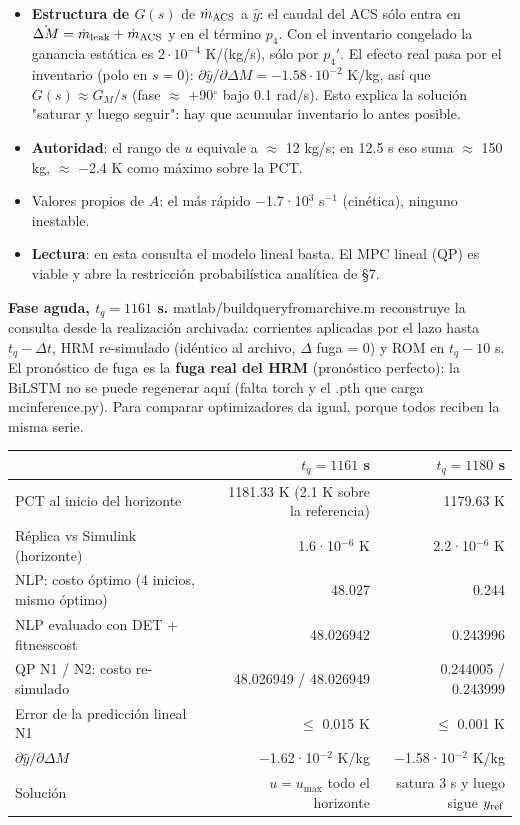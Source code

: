 \documentclass[11pt,a4paper]{article}
\newcommand{\codeus}{\textunderscore\allowbreak}
\newcommand{\code}[1]{{\small\ttfamily\let\_\codeus #1}}
\begin{document}
\begin{itemize}
\item \textbf{Estructura de $G(s)$} de $\dot m_{\rm ACS}$ a $\hat y$: el caudal del ACS sólo entra en $\dot{\Delta M}=\dot m_{\rm leak}+\dot m_{\rm ACS}$ y en el término $p_4$. Con el inventario congelado la ganancia estática es $2\cdot10^{-4}$ K/(kg/s), sólo por $p_4'$. El efecto real pasa por el inventario (polo en $s=0$): $\partial\hat y/\partial\Delta M=-1.58\cdot10^{-2}$ K/kg, así que $G(s)\approx G_M/s$ (fase $\approx$ +90$^\circ$ bajo 0.1 rad/s). Esto explica la solución "saturar y luego seguir": hay que acumular inventario lo antes posible.
\item \textbf{Autoridad}: el rango de $u$ equivale a $\approx$ 12 kg/s; en 12.5 s eso suma $\approx$ 150 kg, $\approx$ $-$2.4 K como máximo sobre la PCT.
\item Valores propios de $A$: el más rápido $-$1.7·10$^{3}$ s$^{-1}$ (cinética), ninguno inestable.
\item \textbf{Lectura}: en esta consulta el modelo lineal basta. El MPC lineal (QP) es viable y abre la restricción probabilística analítica de \S{}7.
\end{itemize}

\textbf{Fase aguda, $t_q=1161$ s.} \code{matlab/build\_query\_from\_archive.m} reconstruye la consulta desde la realización archivada: corrientes aplicadas por el lazo hasta $t_q-\Delta t$, HRM re-simulado (idéntico al archivo, $\Delta$ fuga = 0) y ROM en $t_q-10$ s. El pronóstico de fuga es la \textbf{fuga real del HRM} (pronóstico perfecto): la BiLSTM no se puede regenerar aquí (falta \code{torch} y el \code{.pth} que carga \code{mc\_inference.py}). Para comparar optimizadores da igual, porque todos reciben la misma serie.

{\small
\begin{xltabular}{\linewidth}{@{}YRR@{}}
\toprule
\textbf{} & \textbf{$t_q=1161$ s} & \textbf{$t_q=1180$ s} \\
\midrule
\endhead
PCT al inicio del horizonte & 1181.33 K (2.1 K sobre la referencia) & 1179.63 K \\
Réplica vs Simulink (horizonte) & 1.6·10$^{-6}$ K & 2.2·10$^{-6}$ K \\
NLP: costo óptimo (4 inicios, mismo óptimo) & 48.027 & 0.244 \\
NLP evaluado con \code{DET\_2} + \code{fitness\_cost} & 48.026942 & 0.243996 \\
QP N1 / N2: costo re-simulado & 48.026949 / 48.026949 & 0.244005 / 0.243999 \\
Error de la predicción lineal N1 & $\le$ 0.015 K & $\le$ 0.001 K \\
$\partial\hat y/\partial\Delta M$ & $-$1.62·10$^{-2}$ K/kg & $-$1.58·10$^{-2}$ K/kg \\
Solución & $u=u_{\max}$ todo el horizonte & satura 3 s y luego sigue $y_{\rm ref}$ \\
\bottomrule
\end{xltabular}}
\end{document}
